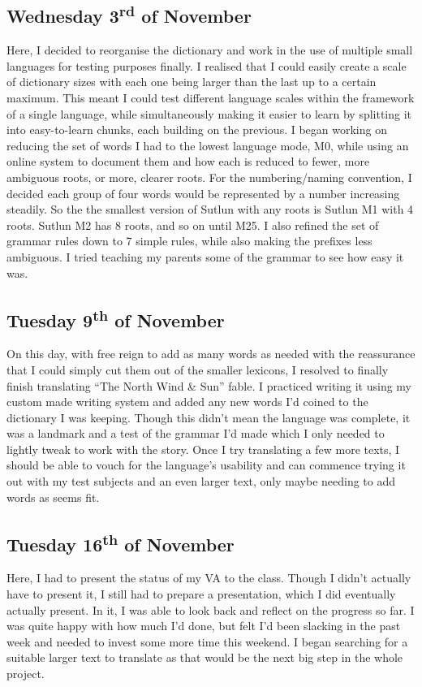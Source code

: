 \documentclass[a4paper,10pt]{article}
\begin{document}
\subsection{Wednesday 3\textsuperscript{rd} of November}
Here, I decided to reorganise the dictionary and work in the use of multiple small languages
for testing purposes finally. I realised that I could easily create a scale of dictionary
sizes with each one being larger than the last up to a certain maximum. This meant I could
test different language scales within the framework of a single language, while simultaneously
making it easier to learn by splitting it into easy-to-learn chunks, each building on the
previous. I began working on reducing the set of words I had to the lowest language mode, M0,
while using an online system to document them and how each is reduced to fewer, more ambiguous
roots, or more, clearer roots. For the numbering/naming convention, I decided each group of
four words would be represented by a number increasing steadily. So the the smallest version of
Sutlun with any roots is Sutlun M1 with 4 roots. Sutlun M2 has 8 roots, and so on until M25.
I also refined the set of grammar rules down to 7 simple rules, while also making the prefixes
less ambiguous. I tried teaching my parents some of the grammar to see how easy it was.

\subsection{Tuesday 9\textsuperscript{th} of November}
On this day, with free reign to add as many words as needed with the reassurance that I could
simply cut them out of the smaller lexicons, I resolved to finally finish translating ``The
North Wind \& Sun'' fable. I practiced writing it using my custom made writing system and
added any new words I'd coined to the dictionary I was keeping. Though this didn't mean the
language was complete, it was a landmark and a test of the grammar I'd made which I only needed
to lightly tweak to work with the story. Once I try translating a few more texts, I should be
able to vouch for the language's usability and can commence trying it out with my test subjects
and an even larger text, only maybe needing to add words as seems fit.

\subsection{Tuesday 16\textsuperscript{th} of November}
Here, I had to present the status of my VA to the class. Though I didn't actually have to
present it, I still had to prepare a presentation, which I did eventually actually present.
In it, I was able to look back and reflect on the progress so far. I was quite happy with
how much I'd done, but felt I'd been slacking in the past week and needed to invest some
more time this weekend. I began searching for a suitable larger text to translate as that
would be the next big step in the whole project.
\end{document}

